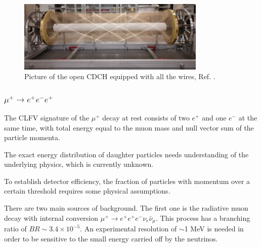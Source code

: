 \begin{figure}[!h]
\centering
\includegraphics[width =0.8\textwidth]{figures/png/Screenshot_20240307_140235.png}
\caption[MEG II detector (II).]{Picture of the open CDCH equipped with all the wires, Ref. \cite{megiicollaboration2024operation}.}
\label{fig:meg2}
\end{figure}






\subsubsection{$\mu^+ \rightarrow e^+ e^-  e^+ $}
{\violet The CLFV signature of the $\mu^+$ decay at rest } consists of two $e^+$ and one $e^-$ at the same time, 
with total energy equal to the muon mass and null vector sum of the
particle momenta.


{\violet The exact energy distribution of daughter particles needs understanding of the underlying physics, 
which is currently unknown.}


{\violet To establish detector efficiency, the fraction of particles with momentum over a certain 
threshold requires some physical assumptions.}


There are two main sources of background. The first one is the radiative muon decay with 
internal conversion  $\mu^+ \rightarrow e^+ e^+ e^- \nu_e \bar{\nu}_\mu$. 
This process has a branching ratio of $BR\sim 3.4 \times 10^{-5}$.
An experimental resolution of $\sim$1 MeV is needed in order to be sensitive to the small energy carried off by the neutrinos. 


